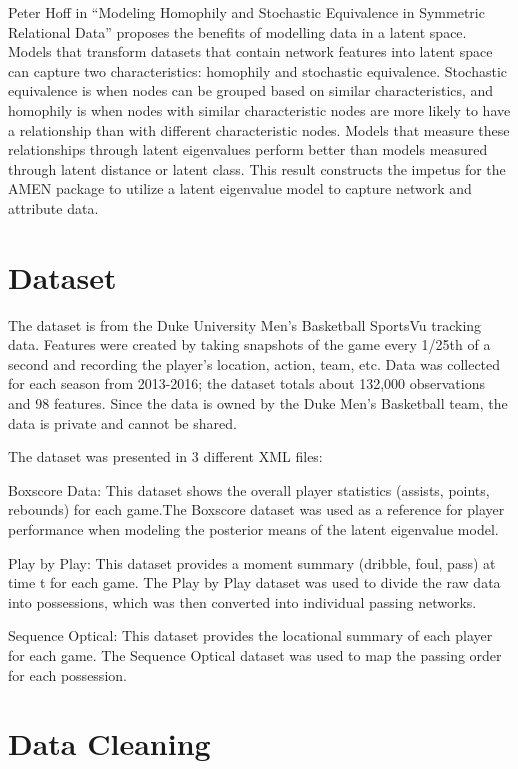 \documentclass[12pt,twoside]{dukestatscithesis}
\theoremstyle{definition}
\theoremstyle{definition}
\theoremstyle{definition}
\theoremstyle{remark}
\begin{document}
Peter Hoff in ``Modeling Homophily and Stochastic Equivalence in
Symmetric Relational Data'' proposes the benefits of modelling data in a
latent space. Models that transform datasets that contain network
features into latent space can capture two characteristics: homophily
and stochastic equivalence. Stochastic equivalence is when nodes can be
grouped based on similar characteristics, and homophily is when nodes
with similar characteristic nodes are more likely to have a relationship
than with different characteristic nodes. Models that measure these
relationships through latent eigenvalues perform better than models
measured through latent distance or latent class. This result constructs
the impetus for the AMEN package to utilize a latent eigenvalue model to
capture network and attribute data.

\chapter{Dataset}\label{dataset}

The dataset is from the Duke University Men's Basketball SportsVu
tracking data. Features were created by taking snapshots of the game
every 1/25th of a second and recording the player's location, action,
team, etc. Data was collected for each season from 2013-2016; the
dataset totals about 132,000 observations and 98 features. Since the
data is owned by the Duke Men's Basketball team, the data is private and
cannot be shared.

The dataset was presented in 3 different XML files:

Boxscore Data: This dataset shows the overall player statistics
(assists, points, rebounds) for each game.The Boxscore dataset was used
as a reference for player performance when modeling the posterior means
of the latent eigenvalue model.

Play by Play: This dataset provides a moment summary (dribble, foul,
pass) at time t for each game. The Play by Play dataset was used to
divide the raw data into possessions, which was then converted into
individual passing networks.

Sequence Optical: This dataset provides the locational summary of each
player for each game. The Sequence Optical dataset was used to map the
passing order for each possession.

\chapter{Data Cleaning}\label{data-cleaning}
\end{document}

